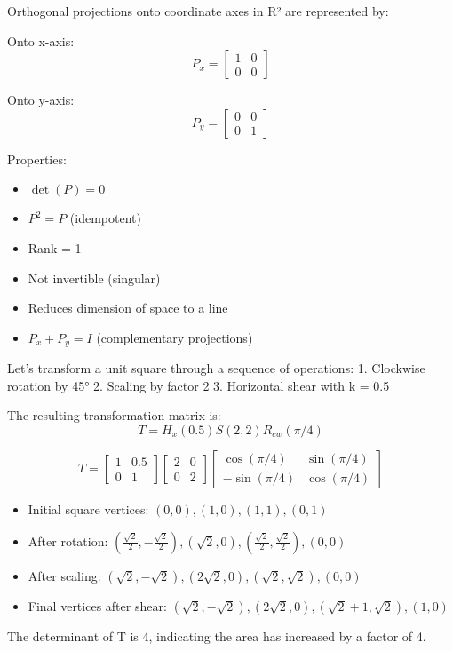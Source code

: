 \begin{definition}
Orthogonal projections onto coordinate axes in R² are represented by:

Onto x-axis:
$$P_x = \begin{bmatrix}
1 & 0 \\
0 & 0
\end{bmatrix}$$

Onto y-axis:
$$P_y = \begin{bmatrix}
0 & 0 \\
0 & 1
\end{bmatrix}$$

Properties:
\begin{itemize}
    \item $\det(P) = 0$
    \item $P^2 = P$ (idempotent)
    \item Rank = 1
    \item Not invertible (singular)
    \item Reduces dimension of space to a line
    \item $P_x + P_y = I$ (complementary projections)
\end{itemize}
\end{definition}

\begin{example}
Let's transform a unit square through a sequence of operations:
1. Clockwise rotation by 45°
2. Scaling by factor 2
3. Horizontal shear with k = 0.5

The resulting transformation matrix is:
$$T = H_x(0.5)S(2,2)R_{cw}(\pi/4)$$

$$T = \begin{bmatrix}
1 & 0.5 \\
0 & 1
\end{bmatrix}
\begin{bmatrix}
2 & 0 \\
0 & 2
\end{bmatrix}
\begin{bmatrix}
\cos(\pi/4) & \sin(\pi/4) \\
-\sin(\pi/4) & \cos(\pi/4)
\end{bmatrix}$$

\begin{itemize}
    \item Initial square vertices: $(0,0), (1,0), (1,1), (0,1)$
    \item After rotation: $(\frac{\sqrt{2}}{2}, -\frac{\sqrt{2}}{2}), (\sqrt{2},0), (\frac{\sqrt{2}}{2}, \frac{\sqrt{2}}{2}), (0,0)$
    \item After scaling: $(\sqrt{2},-\sqrt{2}), (2\sqrt{2},0), (\sqrt{2},\sqrt{2}), (0,0)$
    \item Final vertices after shear: $(\sqrt{2},-\sqrt{2}), (2\sqrt{2},0), (\sqrt{2}+1,\sqrt{2}), (1,0)$
\end{itemize}

The determinant of T is 4, indicating the area has increased by a factor of 4.
\end{example}